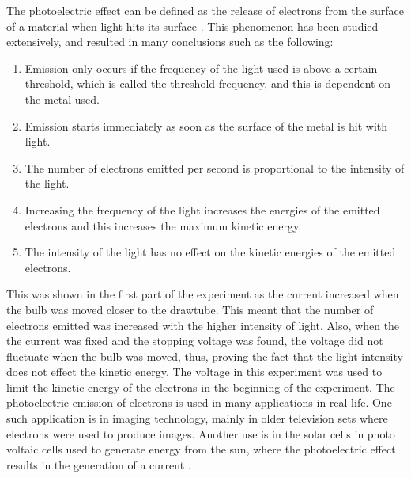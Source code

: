 \documentclass[12pt, a4paper]{article}
\begin{document}
\noindent
The photoelectric effect can be defined as the release of electrons from the surface of a material when light hits its surface \parencite{muncaster}. This phenomenon has been studied extensively, and resulted in many conclusions such as the following:
\begin{enumerate}[label=\roman*.]
    \item Emission only occurs if the frequency of the light used is above a certain threshold, which is called the threshold frequency, and this is dependent on the metal used.
    \item Emission starts immediately as soon as the surface of the metal is hit with light.
    \item The number of electrons emitted per second is proportional to the intensity of the light.
    \item Increasing the frequency of the light increases the energies of the emitted electrons and this increases the maximum kinetic energy.
    \item The intensity of the light has no effect on the kinetic energies of the emitted electrons.
\end{enumerate}
This was shown in the first part of the experiment as the current increased when the bulb was moved closer to the drawtube. This meant that the number of electrons emitted was increased with the higher intensity of light. Also, when the the current was fixed and the stopping voltage was found, the voltage did not fluctuate when the bulb was moved, thus, proving the fact that the light intensity does not effect the kinetic energy. The voltage in this experiment was used to limit the kinetic energy of the electrons in the beginning of the experiment. The photoelectric emission of electrons is used in many applications in real life. One such application is in imaging technology, mainly in older television sets where electrons were used to produce images.  Another use is in the solar cells in photo voltaic cells used to generate energy from the sun, where the photoelectric effect results in the generation of a current \parencite{Photoelectric}.

\printbibliography[title = {References:}]
\end{document}

